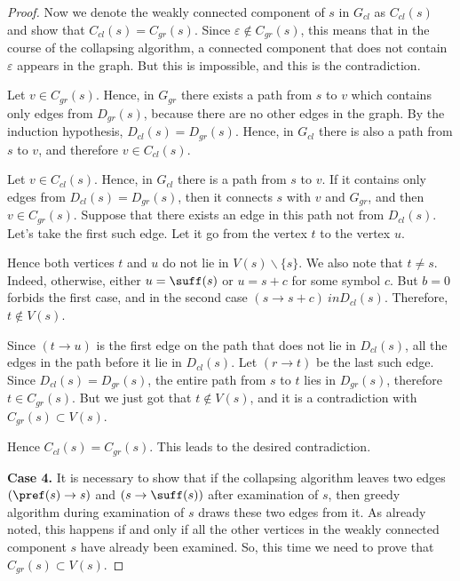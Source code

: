 \begin{proof}
Now we denote the weakly connected component of $ s $ in $ G_{cl} $ as $ C_{cl} (s) $ and show that $ C_{cl} (s) = C_{gr} (s) $. Since $ \varepsilon \notin C_{gr} (s) $, this means that in the course of the collapsing algorithm, a connected component that does not contain $ \varepsilon $ appears in the graph. But this is impossible, and this is the contradiction.

Let $ v \in C_{gr} (s) $. Hence, in $ G_{gr} $ there exists a path from $ s $ to $ v $ which contains only edges from $ D_{gr} (s) $, because there are no other edges in the graph. By the induction hypothesis, $ D_{cl} (s) = D_{gr} (s) $. Hence, in $ G_{cl} $ there is also a path from $ s $ to $ v $, and therefore $ v \in C_{cl} (s) $.

Let $ v \in C_{cl} (s) $. Hence, in $ G_{cl} $ there is a path from $ s $ to $ v $. If it contains only edges from $ D_{cl} (s) = D_{gr} (s) $, then it connects $ s $ with $ v $ and $ G_{gr} $, and then $ v \in C_{gr} (s) $. Suppose that there exists an edge in this path not from $ D_{cl} (s) $. Let's take the first such edge. Let it go from the vertex $ t $ to the vertex $ u $.

Hence both vertices $ t $ and $ u $ do not lie in $ V (s) \backslash \{s \} $. We also note that $ t \ne s $. Indeed, otherwise, either $ u = \suff (s) $ or $ u = s + c $ for some symbol $ c $. But $ b = 0 $ forbids the first case, and in the second case $ (s \to s + c) \ in D_{cl} (s) $. Therefore, $ t \notin V (s) $.

Since $ (t \to u) $ is the first edge on the path that does not lie in $ D_{cl} (s) $, all the edges in the path before it lie in $ D_{cl} (s) $. Let $ (r \to t) $ be the last such edge. Since $ D_{cl} (s) = D_{gr} (s) $, the entire path from $ s $ to $ t $ lies in $ D_{gr} (s) $, therefore $ t \in C_{gr} (s) $. But we just got that $ t \notin V (s) $, and it is a contradiction with $ C_{gr} (s) \subset V (s) $.

Hence $ C_{cl} (s) = C_{gr} (s) $. This leads to the desired contradiction.

\textbf {Case 4.} It is necessary to show that if the collapsing algorithm leaves two edges $ (\pref (s) \to s) $ and $ (s \to \suff (s)) $ after examination of $ s $, then greedy algorithm during examination of $ s $ draws these two edges from it. As already noted, this happens if and only if all the other vertices in the weakly connected component $ s $ have already been examined. So, this time we need to prove that $ C_{gr} (s) \subset V (s) $.


\end{proof}

